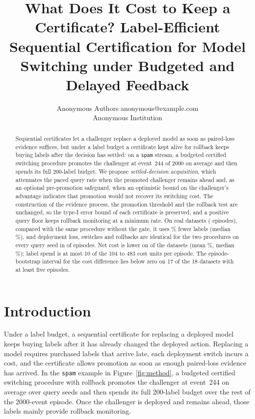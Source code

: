 \documentclass[10pt]{article}
\title{What Does It Cost to Keep a Certificate? Label-Efficient Sequential Certification for Model
Switching under Budgeted and Delayed Feedback}
\author{\name Anonymous Authors \email anonymous@example.com \\
      \addr Anonymous Institution}
\begin{document}
\maketitle

\begin{abstract}
Sequential certificates let a challenger replace a deployed model as soon as paired-loss
evidence suffices, but under a label budget a certificate kept alive for rollback keeps buying
labels after the decision has settled: on a \texttt{spam} stream, a budgeted certified switching
procedure promotes the challenger at event~244 of 2000 on average and then spends its full
200-label budget. We propose \emph{settled-decision acquisition}, which attenuates the paced query
rate when the promoted challenger remains ahead and, as an optional pre-promotion safeguard, when
an optimistic bound on the challenger's advantage indicates that promotion would not recover its
switching cost. The construction of the evidence process, the promotion threshold and the rollback
test are unchanged,
so the type-I error bound of each certificate is preserved, and a positive query floor keeps
rollback monitoring at a minimum rate. On \NStreams{} real datasets (\NEpisodes{} episodes),
compared with the same procedure without the gate, it uses \MeanSaving\% fewer labels (median
\MedSaving\%), and deployment loss, switches and rollbacks are identical for the two procedures on
every query seed in \NSameEpisodes{} of \NEpisodes{} episodes. Net cost is lower on \NCheaper{} of
the \NStreams{} datasets (mean \MeanCostChange\%, median \MedCostChange\%); label spend is at most
10 of the 104 to 483 cost units per episode. The episode-bootstrap interval for the cost
difference lies below zero on 17 of the 18 datasets with at least five episodes.
\end{abstract}

\section{Introduction}
Under a label budget, a sequential certificate for replacing a deployed model keeps buying labels
after it has already changed the deployed action. Replacing a model requires purchased labels that
arrive late, each deployment switch incurs a cost, and the certificate allows promotion as soon as
enough paired-loss evidence has arrived. In the \texttt{spam} example in
Figure~\ref{fig:method}, a budgeted certified switching procedure with rollback promotes the
challenger at event~244 on average over query seeds and then spends its full 200-label budget
over the rest of the 2000-event episode. Once the challenger is deployed and remains ahead, those
labels mainly provide rollback monitoring.
\end{document}
